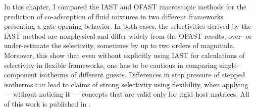 \documentclass[thesis]{subfiles}
\begin{document}

In this chapter, I compared the IAST and OFAST macroscopic methods for the
prediction of co-adsorption of fluid mixtures in two different frameworks
presenting a gate-opening behavior. In both cases, the selectivities derived by
the IAST method are nonphysical and differ widely from the OFAST results, over-
or under-estimate the selectivity, sometimes by up to two orders of magnitude.
Moreover, this show that even without explicitly using IAST for calculations of
selectivity in flexible frameworks, one has to be cautious in comparing
single-component isotherms of different guests. Differences in step pressure of
stepped isotherms can lead to claims of strong selectivity using flexibility,
when applying --- without noticing it --- concepts that are valid only for rigid
host matrices. All of this work is published in \cite{Fraux2018}.
\end{document}
